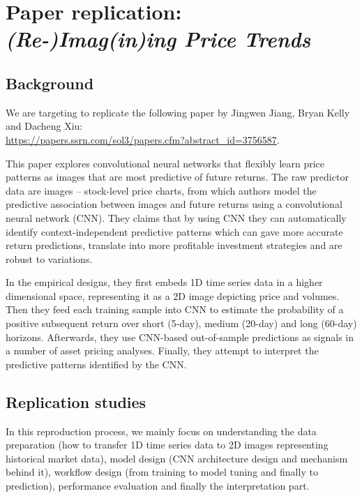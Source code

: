 \documentclass[11pt]{article}
\begin{document}
\newpage 


\section{Paper replication: \emph{(Re-)Imag(in)ing Price Trends}}

\subsection{Background}
We are targeting to replicate the following paper by Jingwen Jiang, Bryan Kelly and Dacheng Xiu: \\
\url{https://papers.ssrn.com/sol3/papers.cfm?abstract_id=3756587}.

This paper explores convolutional neural networks that flexibly learn price patterns as images that are most predictive of future returns. The raw predictor data are images -- stock-level price charts, from which authors model the predictive association between images and future returns using a convolutional neural network (CNN). They claims that by using CNN they can automatically identify context-independent predictive patterns which can gave more accurate return predictions, translate into more profitable investment strategies and are robust to variations. 

In the empirical designs, they first embeds 1D time series data in a higher dimensional space, representing it as a 2D image depicting price and volumes. Then they feed each training sample into CNN to estimate the probability of a positive subsequent return over short (5-day), medium (20-day) and long (60-day) horizons. Afterwards, they use CNN-based out-of-sample predictions as signals in a number of asset pricing analyses. Finally, they attempt to interpret the predictive patterns identified by the CNN.

\subsection{Replication studies}
In this reproduction process, we mainly focus on understanding the data preparation (how to transfer 1D time series data to 2D images representing historical market data), model design (CNN architecture design and mechanism behind it), workflow design (from training to model tuning and finally to prediction), performance evaluation and finally the interpretation part.
\end{document}
